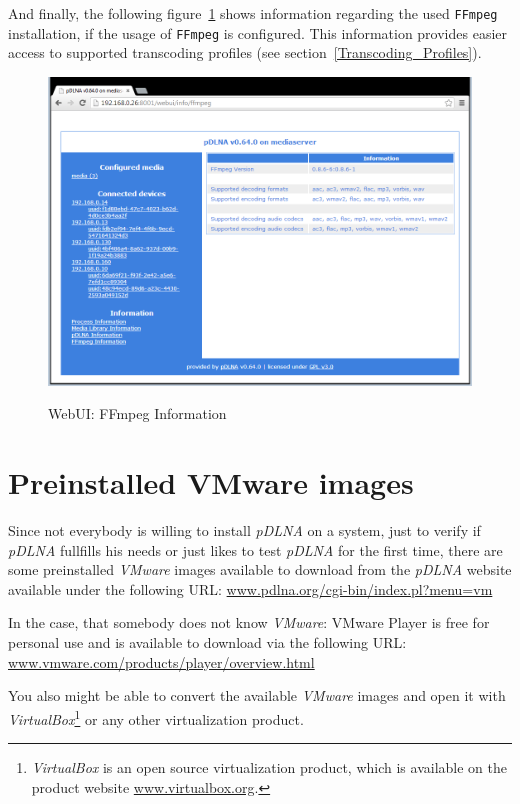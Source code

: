 \documentclass[a4paper,oneside,10pt]{report}
\begin{document}
And finally, the following figure~\ref{fig:webgui-ffmpeg} shows information regarding the used \verb|FFmpeg| installation, if the usage of \verb|FFmpeg| is configured. This information provides easier access to supported transcoding profiles (see section~\ref{Transcoding_Profiles}).

\begin{figure}
	\centering
		\includegraphics[width=34em]{images/webui_info_ffmpeg}
	\label{fig:webgui-ffmpeg}
	\caption{WebUI: FFmpeg Information}
\end{figure}

%
%

\chapter{Preinstalled VMware images}
\label{vms}

Since not everybody is willing to install {\em pDLNA} on a system, just to verify if {\em pDLNA} fullfills his needs or just likes to test {\em pDLNA} for the first time, there are some preinstalled {\em VMware} images available to download from the {\em pDLNA} website available under the following URL: \url{www.pdlna.org/cgi-bin/index.pl?menu=vm}

In the case, that somebody does not know {\em VMware}: VMware Player is free for personal use and is available to download via the following URL: \url{www.vmware.com/products/player/overview.html}

You also might be able to convert the available {\em VMware} images and open it with {\em VirtualBox}\footnote{{\em VirtualBox} is an open source virtualization product, which is available on the product website \url{www.virtualbox.org}.} or any other virtualization product.
\end{document}

